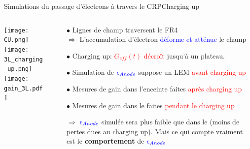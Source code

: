     \begin{frame}{Simulations du passage d'électrons à travers le CRP}{Charging up}
    	\begin{scriptsize}
    		\begin{columns}
    			\begin{column}{0.5\textwidth}
    				\texttt{[image: CU.png]}\\
                    \vspace{0.1cm}
    				\texttt{[image: 3L\_charging\_up.png]}\\
    				\texttt{[image: gain\_3L.pdf]}
    			\end{column}\hfill
    			\begin{column}{0.5\textwidth}
    				\begin{itemize}
    					\item[$\bullet$] Lignes de champ traversent le FR4\\
    					$\Rightarrow$ L'accumulation d'électron \textcolor{blue}{déforme et atténue} le champ
    					\item[$\bullet$] Charging up: \textcolor{red}{$G_{eff}(t)$ décroît} jusqu'à un plateau.
    				\end{itemize}
    				\vspace{0.3cm}
    				\begin{itemize}
    					\item[$\bullet$] Simulation de $\textcolor{blue}{\epsilon_{Anode}}$ suppose un LEM \textcolor{red}{avant charging up}
    					\item[$\bullet$] Mesures de gain dans l'enceinte faites \textcolor{red}{après charging up}
    					\item[$\bullet$] Mesures de gain dans le \TOO{} faites \textcolor{red}{pendant le charging up}
    					\item[$\Rightarrow$] $\textcolor{blue}{\epsilon_{Anode}}$ simulée sera plus faible que dans le \TOO{} (moins de pertes dues au charging up). Mais ce qui compte vraiment est le \textbf{comportement} de $\textcolor{blue}{\epsilon_{Anode}}$
    				\end{itemize}
    			\end{column}
    		\end{columns}
    	\end{scriptsize}
    \end{frame}
    
